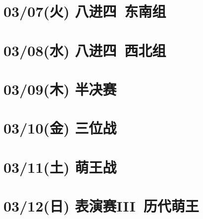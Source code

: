 \section{03/07(火) 八进四~东南组}
\section{03/08(水) 八进四~西北组}
\section{03/09(木) 半决赛}
\section{03/10(金) 三位战}
\section{03/11(土) 萌王战}

\section{03/12(日) 表演赛III~历代萌王}
